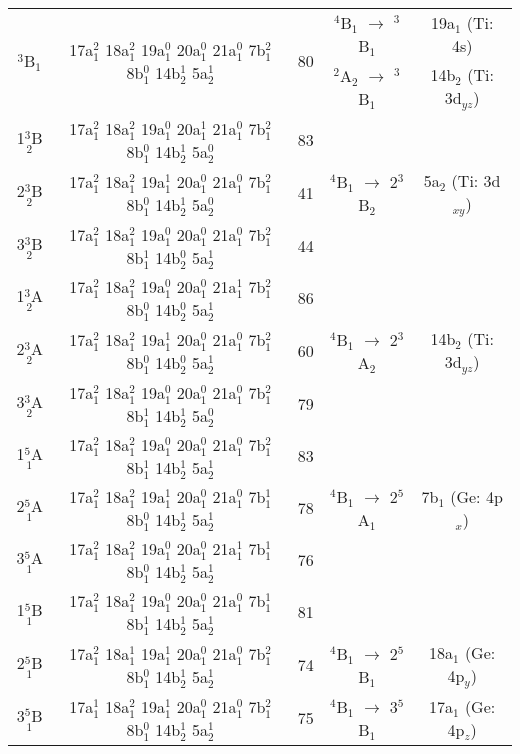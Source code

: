 \begin{refsection}
\begin{center}
\begin{landscape}
\begin{longtable}{@{}ccccc@{}}
	\multirow{2}{*}{$^3$B$_1$} & \multirow{2}{*}{17a$_1^2$ 18a$_1^2$ 19a$_1^0$ 20a$_1^0$ 21a$_1^0$ 7b$_1^2$ 8b$_1^0$ 14b$_2^1$ 5a$_2^1$} & \multirow{2}{*}{80} & $^4$B$_1$ $\longrightarrow$ $^3$B$_1$  & 19a$_1$ (Ti: 4s)      \\
						 &    &  & $^2$A$_2$ $\longrightarrow$ $^3$B$_1$  & 14b$_2$ (Ti: 3d$_{yz}$)    \\
	1$^3$B$_2$   & 17a$_1^2$ 18a$_1^2$ 19a$_1^0$ 20a$_1^1$ 21a$_1^0$ 7b$_1^2$ 8b$_1^0$ 14b$_2^1$ 5a$_2^0$  & 83   &    &                    \\
	2$^3$B$_2$   & 17a$_1^2$ 18a$_1^2$ 19a$_1^1$ 20a$_1^0$ 21a$_1^0$ 7b$_1^2$ 8b$_1^0$ 14b$_2^1$ 5a$_2^0$  & 41   & $^4$B$_1$ $\longrightarrow$ 2$^3$B$_2$ & 5a$_2$ (Ti: 3d$_{xy}$)   \\
	3$^3$B$_2$   & 17a$_1^2$ 18a$_1^2$ 19a$_1^0$ 20a$_1^0$ 21a$_1^0$ 7b$_1^2$ 8b$_1^1$ 14b$_2^0$ 5a$_2^1$  & 44   &    &                    \\
	1$^3$A$_2$   & 17a$_1^2$ 18a$_1^2$ 19a$_1^0$ 20a$_1^0$ 21a$_1^1$ 7b$_1^2$ 8b$_1^0$ 14b$_2^0$ 5a$_2^1$  & 86   &    &                    \\
	2$^3$A$_2$   & 17a$_1^2$ 18a$_1^2$ 19a$_1^1$ 20a$_1^0$ 21a$_1^0$ 7b$_1^2$ 8b$_1^0$ 14b$_2^0$ 5a$_2^1$  & 60   & $^4$B$_1$ $\longrightarrow$ 2$^3$A$_2$ & 14b$_2$ (Ti: 3d$_{yz}$)    \\
	3$^3$A$_2$   & 17a$_1^2$ 18a$_1^2$ 19a$_1^0$ 20a$_1^0$ 21a$_1^0$ 7b$_1^2$ 8b$_1^1$ 14b$_2^1$ 5a$_2^0$  & 79   &    &                    \\
	1$^5$A$_1$   & 17a$_1^2$ 18a$_1^2$ 19a$_1^0$ 20a$_1^0$ 21a$_1^0$ 7b$_1^2$ 8b$_1^1$ 14b$_2^1$ 5a$_2^1$  & 83   &    &                    \\
	2$^5$A$_1$   & 17a$_1^2$ 18a$_1^2$ 19a$_1^1$ 20a$_1^0$ 21a$_1^0$ 7b$_1^1$ 8b$_1^0$ 14b$_2^1$ 5a$_2^1$  & 78   & $^4$B$_1$ $\longrightarrow$ 2$^5$A$_1$ & 7b$_1$ (Ge: 4p$_x$)      \\
	3$^5$A$_1$   & 17a$_1^2$ 18a$_1^2$ 19a$_1^0$ 20a$_1^0$ 21a$_1^1$ 7b$_1^1$ 8b$_1^0$ 14b$_2^1$ 5a$_2^1$  & 76   &    &                    \\
	1$^5$B$_1$   & 17a$_1^2$ 18a$_1^2$ 19a$_1^0$ 20a$_1^0$ 21a$_1^0$ 7b$_1^1$ 8b$_1^1$ 14b$_2^1$ 5a$_2^1$  & 81   &    &                    \\
	2$^5$B$_1$   & 17a$_1^2$ 18a$_1^1$ 19a$_1^1$ 20a$_1^0$ 21a$_1^0$ 7b$_1^2$ 8b$_1^0$ 14b$_2^1$ 5a$_2^1$  & 74   & $^4$B$_1$ $\longrightarrow$ 2$^5$B$_1$ & 18a$_1$ (Ge: 4p$_y$)     \\
	3$^5$B$_1$   & 17a$_1^1$ 18a$_1^2$ 19a$_1^1$ 20a$_1^0$ 21a$_1^0$ 7b$_1^2$ 8b$_1^0$ 14b$_2^1$ 5a$_2^1$  & 75   & $^4$B$_1$ $\longrightarrow$ 3$^5$B$_1$ & 17a$_1$ (Ge: 4p$_z$)     \\

\end{longtable}
\end{landscape}
\end{center}
\end{refsection}
